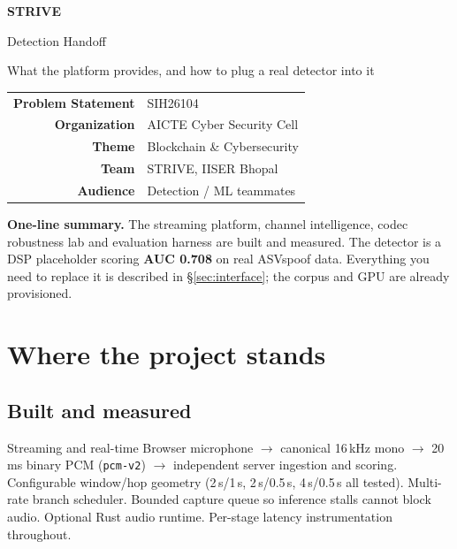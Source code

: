 \documentclass[11pt,a4paper]{article}
\newcommand{\code}[1]{\texttt{\small #1}}
\begin{document}
\begin{titlepage}
\centering
\vspace*{1.8cm}
{\Huge\bfseries\color{strivenavy} STRIVE\par}
\vspace{0.5cm}
{\LARGE\color{striveteal} Detection Handoff\par}
\vspace{0.4cm}
{\large What the platform provides, and how to plug a real detector into it\par}
\vspace{2cm}
\begin{tabular}{rl}
\textbf{Problem Statement} & SIH26104\\
\textbf{Organization} & AICTE Cyber Security Cell\\
\textbf{Theme} & Blockchain \& Cybersecurity\\
\textbf{Team} & STRIVE, IISER Bhopal\\
\textbf{Audience} & Detection / ML teammates\\
\end{tabular}
\vfill
\begin{tcolorbox}[colback=strivegrey,colframe=strivenavy,width=0.92\textwidth]
\textbf{One-line summary.} The streaming platform, channel intelligence, codec
robustness lab and evaluation harness are built and measured. The detector is a
DSP placeholder scoring \textbf{AUC 0.708} on real ASVspoof data. Everything you
need to replace it is described in \S\ref{sec:interface}; the corpus and GPU are
already provisioned.
\end{tcolorbox}
\vspace{1cm}
\end{titlepage}

\tableofcontents
\newpage

\section{Where the project stands}

\subsection{Built and measured}

\begin{donebox}{Streaming and real-time}
Browser microphone $\to$ canonical 16\,kHz mono $\to$ 20\,ms binary PCM
(\code{pcm-v2}) $\to$ independent server ingestion and scoring. Configurable
window/hop geometry (2\,s/1\,s, 2\,s/0.5\,s, 4\,s/0.5\,s all tested). Multi-rate
branch scheduler. Bounded capture queue so inference stalls cannot block audio.
Optional Rust audio runtime. Per-stage latency instrumentation throughout.
\end{donebox}
\end{document}
